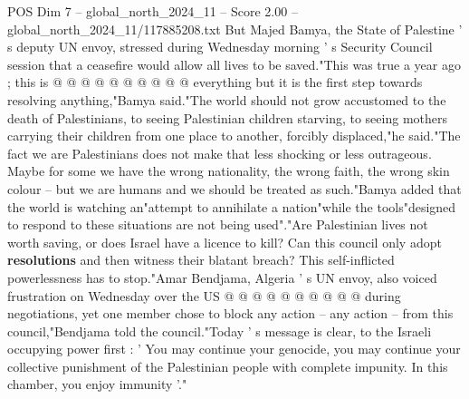 \begin{textsample}{POS Dim 7 – global\_north\_2024\_11 – Score 2.00 – global\_north\_2024\_11/117885208.txt}
But Majed Bamya, the State of Palestine ' s deputy UN envoy, stressed during Wednesday morning ' s Security Council session that a ceasefire would allow all lives to be saved."This was true a year ago ; this is @ @ @ @ @ @ @ @ @ @ everything but it is the first step towards resolving anything,"Bamya said."The world should not grow accustomed to the death of Palestinians, to seeing Palestinian children starving, to seeing mothers carrying their children from one place to another, forcibly displaced,"he said."The fact we are Palestinians does not make that less shocking or less outrageous.
Maybe for some we have the wrong nationality, the wrong faith, the wrong skin colour -- but we are humans and we should be treated as such."Bamya added that the world is watching an"attempt to annihilate a nation"while the tools"designed to respond to these situations are not being used"."Are Palestinian lives not worth saving, or does Israel have a licence to kill?
Can this council only adopt \textbf{resolutions} and then witness their blatant breach?
This self-inflicted powerlessness has to stop."Amar Bendjama, Algeria ' s UN envoy, also voiced frustration on Wednesday over the US @ @ @ @ @ @ @ @ @ @ during negotiations, yet one member chose to block any action -- any action -- from this council,"Bendjama told the council."Today ' s message is clear, to the Israeli occupying power first : ' You may continue your genocide, you may continue your collective punishment of the Palestinian people with complete impunity.
In this chamber, you enjoy immunity '."

\end{textsample}

